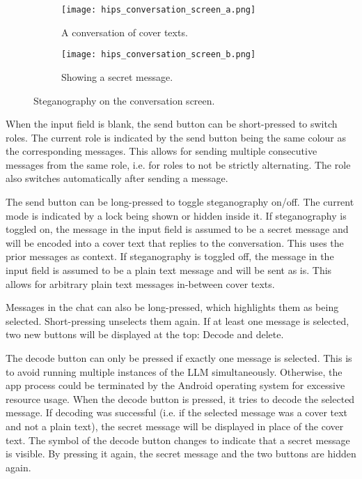 \begin{figure}
	\begin{wide}
		\captionsetup{width=\linewidth}
		\begin{subfigure}{0.45\linewidth}
			\centering
			\texttt{[image: hips\_conversation\_screen\_a.png]}
			\caption{A conversation of cover texts.}
			\label{fig:conversationScreenA}
		\end{subfigure}
        \hfill
		\begin{subfigure}{0.45\linewidth}
			\centering
			\texttt{[image: hips\_conversation\_screen\_b.png]}
			\caption{Showing a secret message.}
			\label{fig:conversationScreenB}
		\end{subfigure}
		\caption[HiPS: Conversation screen]{Steganography on the conversation screen.}
		\label{fig:conversationScreen}
	\end{wide}
\end{figure}

When the input field is blank, the send button can be short-pressed to switch roles. The current role is indicated by the send button being the same colour as the corresponding messages. This allows for sending multiple consecutive messages from the same role, i.e. for roles to not be strictly alternating. The role also switches automatically after sending a message.

The send button can be long-pressed to toggle steganography on/off. The current mode is indicated by a lock being shown or hidden inside it. If steganography is toggled on, the message in the input field is assumed to be a secret message and will be encoded into a cover text that replies to the conversation. This uses the prior messages as context. If steganography is toggled off, the message in the input field is assumed to be a plain text message and will be sent as is. This allows for arbitrary plain text messages in-between cover texts.

Messages in the chat can also be long-pressed, which highlights them as being selected. Short-pressing unselects them again. If at least one message is selected, two new buttons will be displayed at the top: Decode and delete.

The decode button can only be pressed if exactly one message is selected. This is to avoid running multiple instances of the \gls{LLM} simultaneously. Otherwise, the app process could be terminated by the Android operating system for excessive resource usage. When the decode button is pressed, it tries to decode the selected message. If decoding was successful (i.e. if the selected message was a cover text and not a plain text), the secret message will be displayed in place of the cover text. The symbol of the decode button changes to indicate that a secret message is visible. By pressing it again, the secret message and the two buttons are hidden again.

